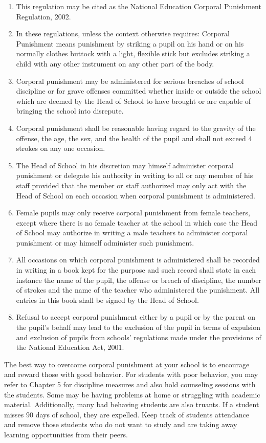 \begin{enumerate}
\item This regulation may be cited as the National Education Corporal Punishment Regulation, 2002.
\item In these regulations, unless the context otherwise requires: Corporal Punishment means punishment by striking a pupil on his hand or on his normally clothes buttock with a light, flexible stick but excludes striking a child with any other instrument on any other part of the body.
\item Corporal punishment may be administered for serious breaches of school discipline or for grave offenses committed whether inside or outside the school which are deemed by the Head of School to have brought or are capable of bringing the school into disrepute.
\item Corporal punishment shall be reasonable having regard to the gravity of the offense, the age, the sex, and the health of the pupil and shall not exceed 4 strokes on any one occasion.
\item The Head of School in his discretion may himself administer corporal punishment or delegate his authority in writing to all or any member of his staff provided that the member or staff authorized may only act with the Head of School on each occasion when corporal punishment is administered.
\item Female pupils may only receive corporal punishment from female teachers, except where there is no female teacher at the school in which case the Head of School may authorize in writing a male teachers to administer corporal punishment or may himself administer such punishment.
\item All occasions on which corporal punishment is administered shall be recorded in writing in a book kept for the purpose and such record shall state in each instance the name of the pupil, the offense or breach of discipline, the number of strokes and the name of the teacher who administered the punishment. All entries in this book shall be signed by the Head of School.
\item Refusal to accept corporal punishment either by a pupil or by the parent on the pupil's behalf may lead to the exclusion of the pupil in terms of expulsion and exclusion of pupils from schools' regulations made under the provisions of the National Education Act, 2001.
\end{enumerate}

The best way to overcome corporal punishment at your school is to encourage and reward those with good behavior.  For students with poor behavior, you may refer to Chapter 5 for discipline measures and also hold counseling sessions with the students.  Some may be having problems at home or struggling with academic material. Additionally, many bad behaving students are also truants. If a student misses 90 days of school, they are expelled.  Keep track of students attendance and remove those students who do not want to study and are taking away learning opportunities from their peers.
 
